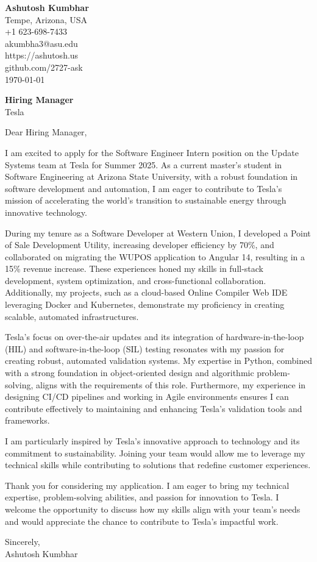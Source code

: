 \documentclass[11pt]{article}
\begin{document}
\begin{flushleft}
\textbf{Ashutosh Kumbhar} \\
Tempe, Arizona, USA \\
+1 623-698-7433 \\
akumbha3@asu.edu \\
https://ashutosh.us \\
github.com/2727-ask \\
\today
\end{flushleft}

\vspace{0.5em}

\textbf{Hiring Manager} \\
Tesla \\

\vspace{1em}

Dear Hiring Manager,

I am excited to apply for the Software Engineer Intern position on the Update Systems team at Tesla for Summer 2025. As a current master’s student in Software Engineering at Arizona State University, with a robust foundation in software development and automation, I am eager to contribute to Tesla’s mission of accelerating the world’s transition to sustainable energy through innovative technology.

During my tenure as a Software Developer at Western Union, I developed a Point of Sale Development Utility, increasing developer efficiency by 70\%, and collaborated on migrating the WUPOS application to Angular 14, resulting in a 15\% revenue increase. These experiences honed my skills in full-stack development, system optimization, and cross-functional collaboration. Additionally, my projects, such as a cloud-based Online Compiler Web IDE leveraging Docker and Kubernetes, demonstrate my proficiency in creating scalable, automated infrastructures.

Tesla’s focus on over-the-air updates and its integration of hardware-in-the-loop (HIL) and software-in-the-loop (SIL) testing resonates with my passion for creating robust, automated validation systems. My expertise in Python, combined with a strong foundation in object-oriented design and algorithmic problem-solving, aligns with the requirements of this role. Furthermore, my experience in designing CI/CD pipelines and working in Agile environments ensures I can contribute effectively to maintaining and enhancing Tesla’s validation tools and frameworks.

I am particularly inspired by Tesla’s innovative approach to technology and its commitment to sustainability. Joining your team would allow me to leverage my technical skills while contributing to solutions that redefine customer experiences.

Thank you for considering my application. I am eager to bring my technical expertise, problem-solving abilities, and passion for innovation to Tesla. I welcome the opportunity to discuss how my skills align with your team’s needs and would appreciate the chance to contribute to Tesla’s impactful work.

Sincerely, \\
Ashutosh Kumbhar
\end{document}
